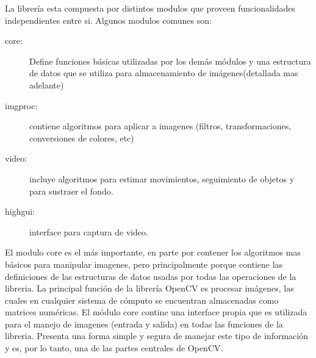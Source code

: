 \documentclass[a4paper,10pt]{report}
\begin{document}
La librería esta compuesta por distintos modulos que proveen funcionalidades independientes entre si. Algunos modulos comunes son:
\begin{description}
 \item[core:] Define funciones básicas utilizadas por los demás módulos y una estructura de datos que se utiliza para almacenamiento de imágenes(detallada mas adelante)  
 \item[imgproc:] contiene algoritmos para aplicar a imagenes (filtros, transformaciones, conversiones de colores, etc)
 \item[video:] incluye algoritmos para estimar movimientos, seguimiento de objetos y para sustraer el fondo.
 \item[highgui:] interface para captura de video.
\end{description}










El modulo core es el más importante, en parte por contener los algoritmos mas básicos para manipular imagenes, 
pero principalmente porque contiene las definiciones de las estructuras de datos usadas por todas las operaciones de la libreria. 
La principal función de la librería OpenCV es procesar imágenes, las cuales en cualquier sistema de cómputo se encuentran almacenadas como matrices numéricas. 
El módulo core contine una interface propia que es utilizada para el manejo de imagenes (entrada y salida) en todas las funciones de la libreria. 
Presenta una forma simple y segura de manejar este tipo de información y es, por lo tanto, una de las partes centrales de OpenCV.
\end{document}

